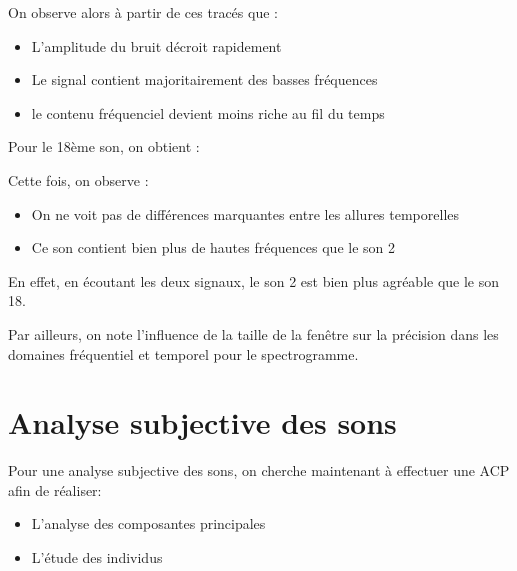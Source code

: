 \documentclass[12pt,a4paper,titlepage]{article}
\begin{document}
On observe alors à partir de ces tracés que :
\begin{itemize}
    \item{L'amplitude du bruit décroit rapidement}
    \item{Le signal contient majoritairement des basses fréquences}
    \item{le contenu fréquenciel devient moins riche au fil du temps}
\end{itemize}

Pour le 18ème son, on obtient :

\begin{figure}[H]
 \hfill
 \hfill
\caption{}
\end{figure}

Cette fois, on observe :
\begin{itemize}
    \item{On ne voit pas de différences marquantes entre les allures temporelles}
    \item{Ce son contient bien plus de hautes fréquences que le son 2}
\end{itemize}

En effet, en écoutant les deux signaux, le son 2 est bien plus agréable
que le son 18.

Par ailleurs, on note l'influence de la taille de la fenêtre sur la précision dans les domaines
fréquentiel et temporel pour le spectrogramme.

\section{Analyse subjective des sons}

Pour une analyse subjective des sons,
on cherche maintenant à effectuer une ACP afin de réaliser:
\begin{itemize}
    \item{L'analyse des composantes principales}
    \item{L'étude des individus}
\end{itemize}
\end{document}
